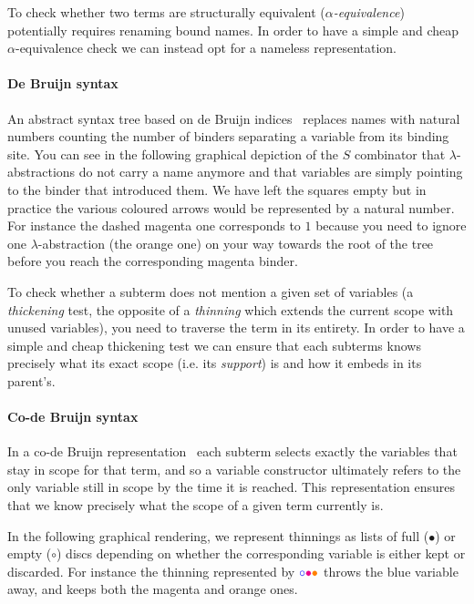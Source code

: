 
To check whether two terms are structurally equivalent (\emph{$\alpha$-equivalence})
potentially requires renaming bound names.
%
In order to have a simple and cheap $\alpha$-equivalence check we can instead opt
for a nameless representation.

\paragraph{De Bruijn syntax}
An abstract syntax tree based on de Bruijn indices~\cite{MANUAL:journals/math/debruijn72}
replaces names with natural numbers counting the number of binders separating a variable
from its binding site.
%
You can see in the following graphical depiction of the $S$ combinator that
$\lambda$-abstractions do not carry a name anymore and that variables are simply pointing
to the binder that introduced them. We have left the squares empty but in practice
the various coloured arrows would be represented by a natural number.
%
For instance the {\color{magenta}dashed magenta} one corresponds to $1$
because you need to ignore one $\lambda{}$-abstraction
(the {\color{orange}orange} one) on your way towards the root of the tree
before you reach the corresponding magenta binder.


To check whether a subterm does not mention a given set of variables
(a \emph{thickening} test, the opposite of a \emph{thinning} which extends the
current scope with unused variables), you need to traverse the term in its entirety.
%
In order to have a simple and cheap thickening test we can ensure that each subterms
knows precisely what its exact scope (i.e. its \emph{support}) is and how it embeds
in its parent's.

\paragraph{Co-de Bruijn syntax}
In a co-de Bruijn
representation~\cite{DBLP:journals/corr/abs-1807-04085} each subterm
selects exactly the variables that stay in scope for that term,
and so a variable constructor ultimately refers to the only variable still
in scope by the time it is reached.
%
This representation ensures that we know precisely what the scope of a given term
currently is.

In the following graphical rendering, we represent thinnings as lists of full
($\bullet$) or empty ($\circ$) discs depending on whether the corresponding
variable is either kept or discarded.
For instance the thinning represented by
$\color{blue}{\circ}\color{magenta}{\bullet}\color{orange}{\bullet}$
throws the {\color{blue}blue} variable away, and keeps both the
{\color{magenta}magenta} and {\color{orange}orange} ones.

